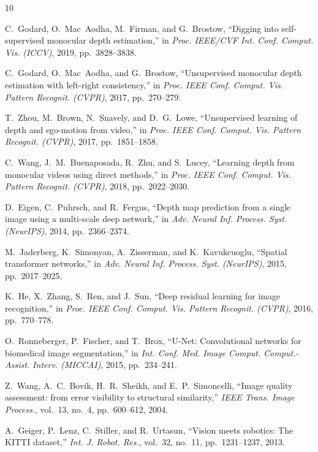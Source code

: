 \documentclass[10pt, a4paper, twocolumn]{article}
\begin{document}
\begin{thebibliography}{10}

C.~Godard, O.~Mac~Aodha, M.~Firman, and G.~Brostow,
``Digging into self-supervised monocular depth estimation,''
in \emph{Proc. IEEE/CVF Int. Conf. Comput. Vis. (ICCV)}, 2019, pp.~3828--3838.

C.~Godard, O.~Mac~Aodha, and G.~Brostow,
``Unsupervised monocular depth estimation with left-right consistency,''
in \emph{Proc. IEEE Conf. Comput. Vis. Pattern Recognit. (CVPR)}, 2017, pp.~270--279.

T.~Zhou, M.~Brown, N.~Snavely, and D.~G.~Lowe,
``Unsupervised learning of depth and ego-motion from video,''
in \emph{Proc. IEEE Conf. Comput. Vis. Pattern Recognit. (CVPR)}, 2017, pp.~1851--1858.

C.~Wang, J.~M.~Buenaposada, R.~Zhu, and S.~Lucey,
``Learning depth from monocular videos using direct methods,''
in \emph{Proc. IEEE Conf. Comput. Vis. Pattern Recognit. (CVPR)}, 2018, pp.~2022--2030.

D.~Eigen, C.~Puhrsch, and R.~Fergus,
``Depth map prediction from a single image using a multi-scale deep network,''
in \emph{Adv. Neural Inf. Process. Syst. (NeurIPS)}, 2014, pp.~2366--2374.

M.~Jaderberg, K.~Simonyan, A.~Zisserman, and K.~Kavukcuoglu,
``Spatial transformer networks,''
in \emph{Adv. Neural Inf. Process. Syst. (NeurIPS)}, 2015, pp.~2017--2025.

K.~He, X.~Zhang, S.~Ren, and J.~Sun,
``Deep residual learning for image recognition,''
in \emph{Proc. IEEE Conf. Comput. Vis. Pattern Recognit. (CVPR)}, 2016, pp.~770--778.

O.~Ronneberger, P.~Fischer, and T.~Brox,
``U-Net: Convolutional networks for biomedical image segmentation,''
in \emph{Int. Conf. Med. Image Comput. Comput.-Assist. Interv. (MICCAI)}, 2015, pp.~234--241.

Z.~Wang, A.~C.~Bovik, H.~R.~Sheikh, and E.~P.~Simoncelli,
``Image quality assessment: from error visibility to structural similarity,''
\emph{IEEE Trans. Image Process.}, vol.~13, no.~4, pp.~600--612, 2004.

A.~Geiger, P.~Lenz, C.~Stiller, and R.~Urtasun,
``Vision meets robotics: The KITTI dataset,''
\emph{Int. J. Robot. Res.}, vol.~32, no.~11, pp.~1231--1237, 2013.

\end{thebibliography}
\end{document}
